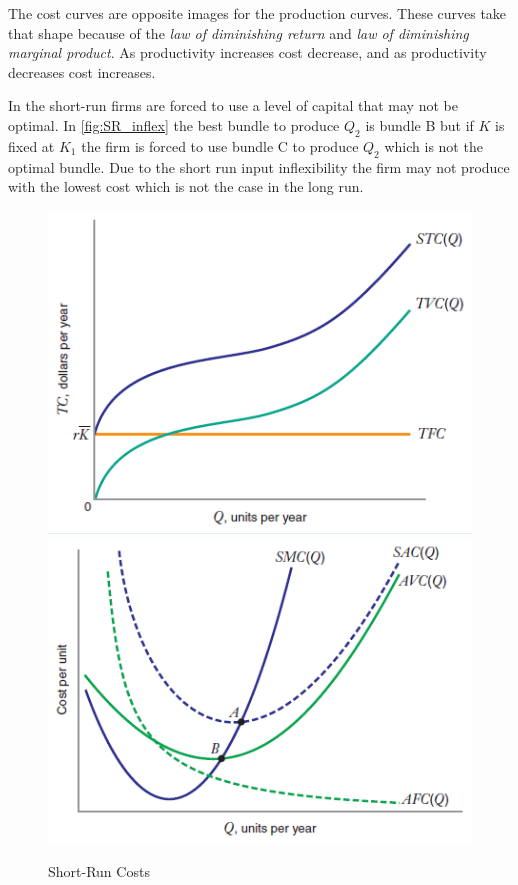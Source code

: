 \documentclass[../ECON-281-Notes.tex]{subfiles}
\begin{document}
The cost curves are opposite images for the production curves. These curves take that shape because of the \emph{law of diminishing return} and \emph{law of diminishing marginal product}. As productivity increases cost decrease, and as productivity decreases cost increases. 

In the short-run firms are forced to use a level of capital that may not be optimal. In \cref{fig:SR_inflex} the best bundle to produce \(Q_2\) is bundle B but if \(K\) is fixed at \(K_1\) the firm is forced to use bundle C to produce \(Q_2\) which is not the optimal bundle. Due to the short run input inflexibility the firm may not produce with the lowest cost which is not the case in the long run. 
\newpage

\begin{figure}[!h]
    \centering
    \includegraphics[width=\columnwidth]{../assets/SRTC.png}   
    \includegraphics[width=\columnwidth]{../assets/SRMAC.png}   
    \caption{Short-Run Costs}
    \label{fig:SR_costs}
\end{figure}
\end{document}
